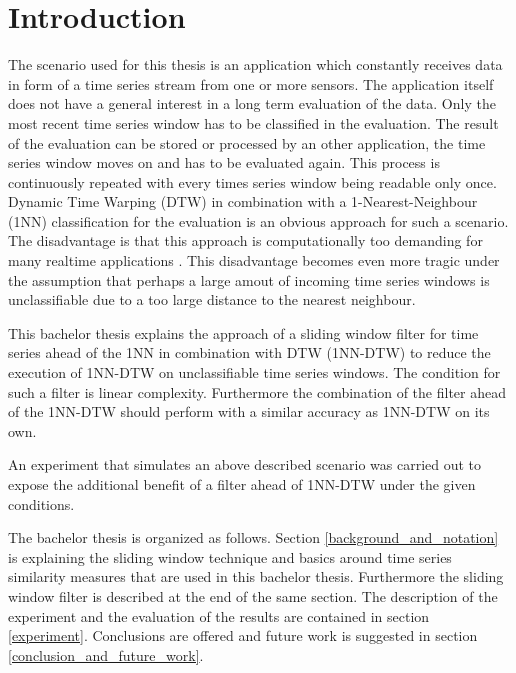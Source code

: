 \section{Introduction} \label{introduction}
The scenario used for this thesis is an application which constantly receives data in form of a time series stream from
one or more sensors. The application itself does not have a general interest in a long term evaluation of the data. Only
the most recent time series window has to be classified in the evaluation. The result of the evaluation can be stored or
processed by an other application, the time series window moves on and has to be evaluated again. This process is
continuously repeated with every times series window being readable only once. Dynamic Time Warping (DTW) in combination
with a 1-Nearest-Neighbour (1NN) classification for the evaluation is an obvious approach for such a scenario. The
disadvantage is that this approach is computationally too demanding for many realtime applications \cite{xi2006fast}.
This disadvantage becomes even more tragic under the assumption that perhaps a large amout of incoming time series
windows is unclassifiable due to a too large distance to the nearest neighbour.

This bachelor thesis explains the approach of a sliding window filter for time series ahead of the 1NN in combination
with DTW (1NN-DTW) to reduce the execution of 1NN-DTW on unclassifiable time series windows. The condition for such a
filter is linear complexity. Furthermore the combination of the filter ahead of the 1NN-DTW should perform with a
similar accuracy as 1NN-DTW on its own.

An experiment that simulates an above described scenario was carried out to expose the additional benefit of a filter
ahead of 1NN-DTW under the given conditions.%

The bachelor thesis is organized as follows. Section \ref{background_and_notation} is explaining the sliding window
technique and basics around time series similarity measures that are used in this bachelor thesis. Furthermore
the sliding window filter is described at the end of the same section. The description of the experiment and the
evaluation of the results are contained in section \ref{experiment}. Conclusions are offered and future work
is suggested in section \ref{conclusion_and_future_work}.
